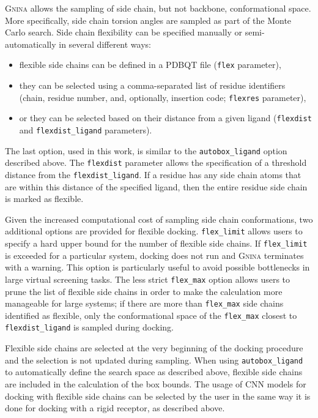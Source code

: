 \documentclass[linenumbers,doublespacing]{bmcart}
\begin{document}
\textsc{Gnina} allows the sampling of side chain, but not backbone, conformational space. More specifically, side chain torsion angles are sampled as part of the Monte Carlo search. Side chain flexibility can be specified manually or semi-automatically in several different ways: 
\begin{itemize}
    \item flexible side chains can be defined in a PDBQT file (\texttt{flex} parameter),
    \item they can be selected using a comma-separated list of residue identifiers (chain, residue number, and, optionally, insertion code; \texttt{flexres} parameter),
    \item or they can be selected based on their distance from a given ligand (\texttt{flexdist} and \texttt{flexdist\_ligand} parameters).
\end{itemize}
The last option, used in this work, is similar to the \texttt{autobox\_ligand} option described above. The \texttt{flexdist} parameter allows the specification of a threshold distance from the \texttt{flexdist\_ligand}. If a residue has any side chain atoms that are within this distance of the specified ligand, then the entire residue side chain is marked as flexible. 

Given the increased computational cost of sampling side chain conformations, two additional options are provided for flexible docking. \texttt{flex\_limit} allows users to specify a hard upper bound for the number of flexible side chains. If \texttt{flex\_limit} is exceeded for a particular system, docking does not run and \textsc{Gnina} terminates with a warning. This option is particularly useful to avoid possible bottlenecks in large virtual screening tasks. The less strict \texttt{flex\_max} option allows users to prune the list of flexible side chains in order to make the calculation more manageable for large systems; if there are more than \texttt{flex\_max} side chains identified as flexible, only the conformational space of the \texttt{flex\_max} closest to \texttt{flexdist\_ligand} is sampled during docking.

Flexible side chains are selected at the very beginning of the docking procedure and the selection is not updated during sampling. When using \texttt{autobox\_ligand} to automatically define the search space as described above, flexible side chains are included in the calculation of the box bounds. The usage of CNN models for docking with flexible side chains can be selected by the user in the same way it is done for docking with a rigid receptor, as described above.
\end{document}

